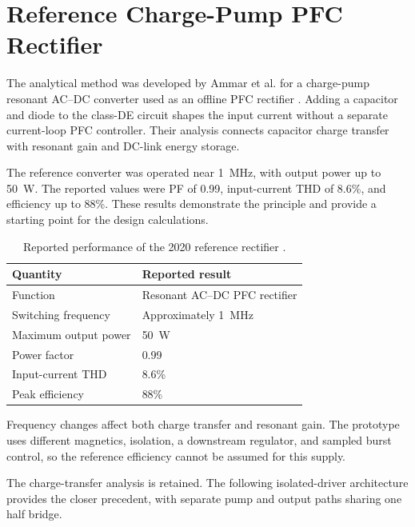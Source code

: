 \section{Reference Charge-Pump PFC Rectifier}
\label{sec:bg-ref2020}

The analytical method was developed by Ammar et al. for a charge-pump resonant AC--DC converter used as an offline PFC rectifier \cite{ammar2020chargepump}. Adding a capacitor and diode to the class-DE circuit shapes the input current without a separate current-loop PFC controller. Their analysis connects capacitor charge transfer with resonant gain and DC-link energy storage.

The reference converter was operated near \SI{1}{\mega\hertz}, with output power up to \SI{50}{\watt}. The reported values were PF of 0.99, input-current THD of 8.6\%, and efficiency up to 88\%. These results demonstrate the principle and provide a starting point for the design calculations.

\begin{table}[htbp]
\centering
\caption{Reported performance of the 2020 reference rectifier \cite{ammar2020chargepump}.}
\label{tab:bg-ref2020-benchmark}
\begin{tabularx}{\textwidth}{@{}L{0.42\textwidth}Y@{}}
\toprule
Quantity & Reported result\\
\midrule
Function & Resonant AC--DC PFC rectifier\\
Switching frequency & Approximately \SI{1}{\mega\hertz}\\
Maximum output power & \SI{50}{\watt}\\
Power factor & 0.99\\
Input-current THD & 8.6\%\\
Peak efficiency & 88\%\\
\bottomrule
\end{tabularx}
\end{table}

Frequency changes affect both charge transfer and resonant gain. The prototype uses different magnetics, isolation, a downstream regulator, and sampled burst control, so the reference efficiency cannot be assumed for this supply.

The charge-transfer analysis is retained. The following isolated-driver architecture provides the closer precedent, with separate pump and output paths sharing one half bridge.
